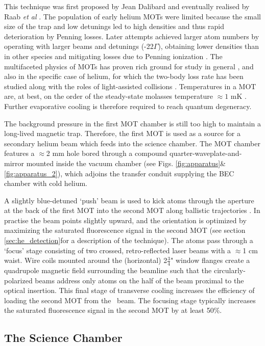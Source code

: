 	This technique was first proposed by Jean Dalibard and eventually realised by Raab \emph{et al} \cite{Raab87}.
	The population of early helium MOTs were limited because the small size of the trap and low detunings led to high densities and thus rapid deterioration by Penning losses.
	Later attempts achieved larger atom numbers by operating with larger beams and detunings (-22$\Gamma$), obtaining lower densities than in other species and mitigating losses due to Penning ionization \cite{Tol99}.
	The multifaceted physics of MOTs has proven rich ground for study in general \cite{Townsend95,Walker90}, and also in the specific case of helium, for which the two-body loss rate has been studied \cite{Tol99} along with the roles of light-assisted collisions \cite{Stas06,McNamara07}. 
	Temperatures in a MOT are, at best, on the order of the steady-state molasses temperature $\approx1$ mK \cite{Lett81}.
	Further evaporative cooling is therefore required to reach quantum degeneracy.
	
	The background pressure in the first MOT chamber is still too high to maintain a long-lived magnetic trap.
	Therefore, the first MOT is used as a source for a secondary helium beam which feeds into the science chamber.
	The MOT chamber features a $\approx$2 mm hole bored through a compound quarter-waveplate-and-mirror mounted inside the vacuum chamber (see Figs. \ref{fig:apparatus}\& \ref{fig:apparatus_2}), which adjoins the transfer conduit supplying the BEC chamber with cold helium.

	A slightly blue-detuned `push' beam is used to kick atoms through the aperture at the back of the first MOT into the second MOT along ballistic trajectories \cite{Swansson04}.
	In practise the beam points slightly upward, and the orientation is optimized by maximizing the saturated fluorescence signal in the second MOT (see section \ref{sec:he_detection}for a description of the technique).
	The atoms pass through a `focus' stage consisting of two crossed, retro-reflected laser beams with a $\approx$1 cm waist.
	Wire coils mounted around the (horizontal) 2$\frac{3}{4}$" window flanges create a quadrupole magnetic field surrounding the beamline such that the circularly-polarized beams address only atoms on the half of the beam proximal to the optical insertion.
	This final stage of transverse cooling increases the efficiency of loading the second MOT from the \mhe~beam.
	The focusing stage typically increases the saturated fluorescence signal in the second MOT by at least 50\%.
	

\subsection*{The Science Chamber}

